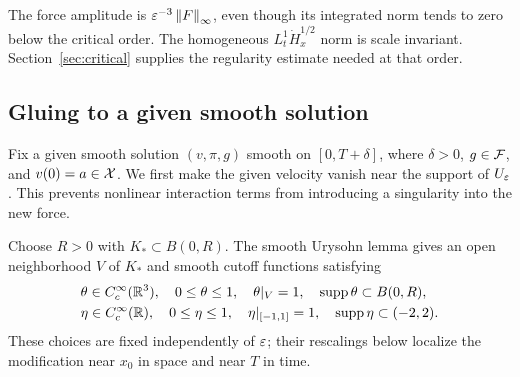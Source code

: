 The force amplitude is $\varepsilon^{-3}\left\lVert F\right\rVert_\infty$, even though its integrated norm tends to zero below the critical order. The homogeneous $L^1_t\dot H^{1/2}_x$ norm is scale invariant. Section~\ref{sec:critical} supplies the regularity estimate needed at that order.

\subsection{Gluing to a given smooth solution}\label{sec:insertion}
Fix a given smooth solution $(v,\pi,g)$ smooth on $[0,T+\delta]$, where
$\delta>0$, $g\in\mathcal F$, and $v(0)=a\in\mathcal X$. We first make the given velocity vanish near the support of $U_\varepsilon$. This prevents nonlinear interaction terms from introducing a singularity into the new force.

Choose $R>0$ with $K_*\subset B(0,R)$. The smooth Urysohn lemma
\cite[Corollary~1.3.4]{petersen} gives an open neighborhood $V$ of $K_*$
and smooth cutoff functions satisfying
\[
\begin{aligned}
 &\theta\in C_c^\infty(\mathbb R^3),\quad 0\le\theta\le1,\quad
   \theta|_V=1,\quad \operatorname{supp}\theta\subset B(0,R),\\
 &\eta\in C_c^\infty(\mathbb R),\quad 0\le\eta\le1,\quad
   \eta|_{[-1,1]}=1,\quad \operatorname{supp}\eta\subset(-2,2).
\end{aligned}
\]
These choices are fixed independently of $\varepsilon$; their rescalings below
localize the modification near $x_0$ in space and near $T$ in time.


